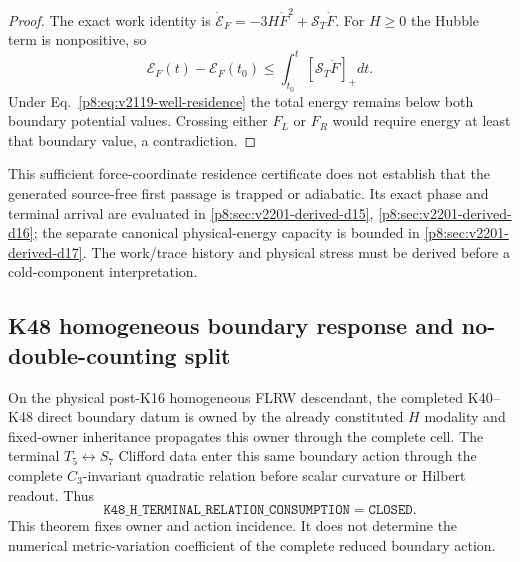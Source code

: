 \documentclass[12pt,a4paper]{article}
\begin{document}
\begin{proof}
The exact work identity is
$\dot{\mathcal E}_F=-3H\dot F^2+\mathcal S_T\dot F$.  For $H\ge0$ the Hubble
term is nonpositive, so
\[
 \mathcal E_F(t)-\mathcal E_F(t_0)
 \le\int_{t_0}^{t}[\mathcal S_T\dot F]_+dt.
\]
Under Eq.~\eqref{p8:eq:v2119-well-residence} the total energy remains below
both boundary potential values.  Crossing either $F_L$ or $F_R$ would require
energy at least that boundary value, a contradiction.
\end{proof}


\begin{remark}
\label{p8:rem:v2201-residence-first-pass}
This sufficient force-coordinate residence certificate does not establish
that the generated source-free first passage is trapped or adiabatic.
Its exact phase and terminal arrival are evaluated in
\ref{p8:sec:v2201-derived-d15}, \ref{p8:sec:v2201-derived-d16}; the separate
canonical physical-energy capacity is bounded in
\ref{p8:sec:v2201-derived-d17}. The work/trace history and physical
stress must be derived before a cold-component interpretation.
\end{remark}




\subsection{K48 homogeneous boundary response and no-double-counting split}
\label{p8:sec:v2141-k48-background-response}

\begin{theorem}
\label{p8:thm:v2141-k48-h-terminal-consumption}
On the physical post-K16 homogeneous FLRW descendant, the completed K40--K48
direct boundary datum is owned by the already constituted $H$ modality and
fixed-owner inheritance propagates this owner through the complete cell.  The
terminal $T_5\leftrightarrow S_7$ Clifford data enter this same boundary action
through the complete $C_3$-invariant quadratic relation before scalar curvature
or Hilbert readout.  Thus
\[
 \boxed{\texttt{K48\_H\_TERMINAL\_RELATION\_CONSUMPTION}=\texttt{CLOSED}.}
\]
This theorem fixes owner and action incidence.  It does not determine the
numerical metric-variation coefficient of the complete reduced boundary action.
\end{theorem}
\end{document}
